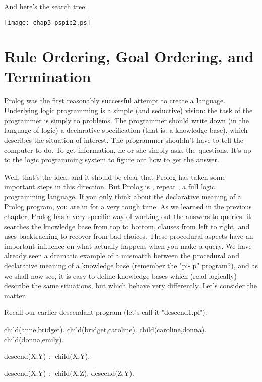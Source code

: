 And here's the search tree:

\begin{center}
\texttt{[image: chap3-pspic2.ps]}
\end{center}

\section{Rule Ordering, Goal Ordering, and Termination}\label{SEC.L3.RO.CO.TERM}



Prolog was the first reasonably successful attempt to create a
 language.  Underlying logic programming is
a simple (and seductive) vision: the task of the programmer is simply
to  problems.  The programmer should write down (in
the language of logic) a declarative specification (that is: a
knowledge base), which describes the situation of interest.  The
programmer shouldn't have to tell the computer  to do.
To get information, he or she simply asks the questions.  It's up to
the logic programming system to figure out how to get the answer.

Well, that's the idea, and it should be clear that Prolog has taken
some important steps in this direction.  But Prolog is ,
repeat , a full logic programming language.  If you only
think about the declarative meaning of a Prolog program, you are in
for a very tough time.  As we learned in the previous chapter, Prolog
has a very specific way of working out the answers to queries: it
searches the knowledge base from top to bottom, clauses from left to
right, and uses backtracking to recover from bad choices. These
procedural aspects have an important influence on what actually
happens when you make a query. We have already seen a dramatic example
of a mismatch between the procedural and declarative meaning of a
knowledge base (remember the "p:- p" program?), and as we shall now
see, it is easy to define knowledge bases which (read logically)
describe the same situations, but which behave very differently.
Let's consider the matter.

Recall our earlier descendant program (let's call it "descend1.pl"):
\begin{LPNcodedisplay}
child(anne,bridget).
child(bridget,caroline).
child(caroline,donna).
child(donna,emily).

descend(X,Y) :- child(X,Y).

descend(X,Y) :- child(X,Z),
                 descend(Z,Y).
\end{LPNcodedisplay}


